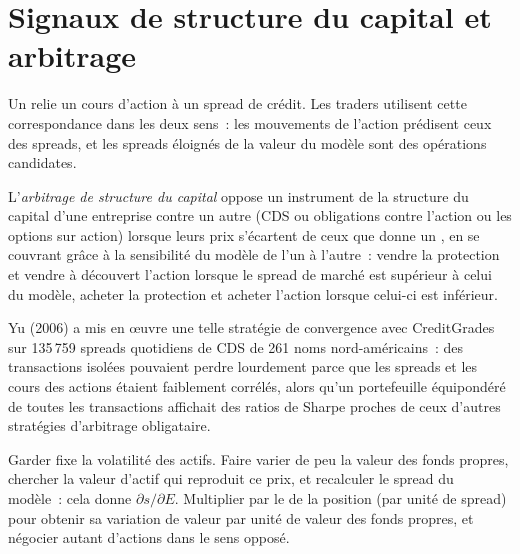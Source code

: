 \section{Signaux de structure du capital et arbitrage}

Un  relie un cours d'action à un spread de crédit. Les traders utilisent cette correspondance dans les deux
sens~: les mouvements de l'action prédisent ceux des spreads, et les spreads éloignés de la valeur du modèle
sont des opérations candidates.

\begin{definition}\label{def:rc:structural-credit-models:csa}
L'\emph{arbitrage de structure du capital} oppose un
instrument de la structure du capital d'une entreprise contre un autre (CDS ou obligations
contre l'action ou les options sur action) lorsque leurs prix s'écartent de ceux que donne un ,
en se couvrant grâce à la sensibilité du modèle de l'un à l'autre~: vendre la protection et vendre à découvert
l'action lorsque le spread de marché est supérieur à celui du modèle, acheter la protection et acheter
l'action lorsque celui-ci est inférieur.
\end{definition}
Yu (2006) a mis en œuvre une telle stratégie de convergence avec CreditGrades sur 135\,759 spreads quotidiens de CDS de 261
noms nord-américains~: des transactions isolées pouvaient perdre lourdement parce que les spreads et les cours des actions étaient faiblement
corrélés, alors qu'un portefeuille équipondéré de toutes les transactions affichait des ratios de Sharpe proches de ceux
d'autres stratégies d'arbitrage obligataire.


\begin{method}\label{met:rc:structural-credit-models:hedge}
Garder fixe la volatilité des actifs. Faire varier de peu la valeur des fonds propres, chercher la valeur
d'actif qui reproduit ce prix, et recalculer le spread du modèle~: cela donne $\partial s/\partial E$.
Multiplier par le  de la position (par unité de spread) pour obtenir sa variation de valeur par unité de
valeur des fonds propres, et négocier autant d'actions dans le sens opposé.
\end{method}

